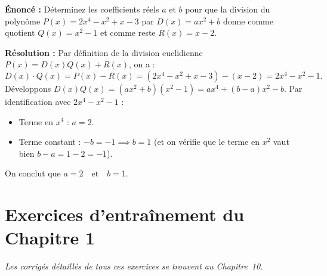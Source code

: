 \begin{exemple}
\textbf{Énoncé :} Déterminez les coefficients réels $a$ et $b$ pour que la division du polynôme $P(x) = 2x^4 - x^2 + x - 3$ par $D(x) = ax^2 + b$ donne comme quotient $Q(x) = x^2 - 1$ et comme reste $R(x) = x - 2$.

\textbf{Résolution :} Par définition de la division euclidienne $P(x) = D(x)Q(x) + R(x)$, on a :
\[
    D(x)\cdot Q(x) = P(x) - R(x) = (2x^4 - x^2 + x - 3) - (x - 2) = 2x^4 - x^2 - 1.
\]
Développons $D(x)Q(x) = (ax^2 + b)(x^2 - 1) = ax^4 + (b - a)x^2 - b$.
Par identification avec $2x^4 - x^2 - 1$ :
\begin{itemize}
    \item Terme en $x^4$ : $a = 2$.
    \item Terme constant : $-b = -1 \implies b = 1$ (et on vérifie que le terme en $x^2$ vaut bien $b - a = 1 - 2 = -1$).
\end{itemize}
On conclut que $\boxed{a = 2 \quad \text{et} \quad b = 1}$.
\end{exemple}

\section{Exercices d'entraînement du Chapitre 1}

\emph{Les corrigés détaillés de tous ces exercices se trouvent au Chapitre~10.}

